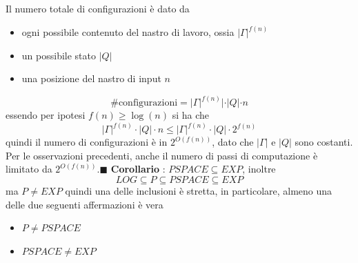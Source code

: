 \documentclass[10pt, letterpaper]{report}
\begin{document}
Il numero totale di configurazioni è dato da\begin{itemize}
    \item ogni possibile contenuto del nastro di lavoro, ossia $|\Gamma|^{f(n)}$
    \item un possibile stato $|Q|$
    \item una posizione del nastro di input $n$
\end{itemize}
$$ \#\text{configurazioni} =|\Gamma|^{f(n)}|\cdot |Q|\cdot n $$
essendo per ipotesi $f(n)\ge \log(n)$ si ha che 
$$|\Gamma|^{f(n)}\cdot |Q|\cdot n \le |\Gamma|^{f(n)}\cdot |Q|\cdot 2^{f(n)} $$
quindi il numero di configurazioni è in $2^{O(f(n))}$, dato che $|\Gamma|$ e $|Q|$ sono costanti. Per le osservazioni precedenti, anche il numero di passi di computazione è limitato da $2^{O(f(n))}$.\hfill$\blacksquare$\acc  
\textbf{Corollario} : $PSPACE\subseteq EXP$, inoltre 
$$ LOG\subseteq P \subseteq PSPACE \subseteq EXP$$
ma $P\ne EXP$ quindi una delle inclusioni è stretta, in particolare, almeno una delle due seguenti affermazioni è vera\begin{itemize}
    \item $P\ne PSPACE$
    \item $PSPACE\ne EXP$
\end{itemize}\flowerLine
\end{document}
